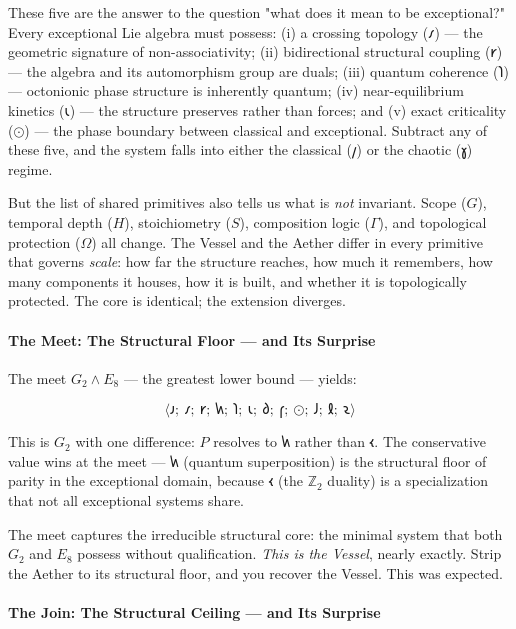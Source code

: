 \documentclass[12pt,a4paper]{article}
\begin{document}
These five are the answer to the question "what does it mean to be exceptional?" Every exceptional Lie algebra must possess: (i) a crossing topology ($𐑥$) --- the geometric signature of non-associativity; (ii) bidirectional structural coupling ($𐑾$) --- the algebra and its automorphism group are duals; (iii) quantum coherence ($𐑐$) --- octonionic phase structure is inherently quantum; (iv) near-equilibrium kinetics ($𐑧$) --- the structure preserves rather than forces; and (v) exact criticality ($⊙$) --- the phase boundary between classical and exceptional. Subtract any of these five, and the system falls into either the classical ($𐑢$) or the chaotic ($𐑣$) regime.

But the list of shared primitives also tells us what is \emph{not} invariant. Scope ($G$), temporal depth ($H$), stoichiometry ($S$), composition logic ($\Gamma$), and topological protection ($\Omega$) all change. The Vessel and the Aether differ in every primitive that governs \emph{scale}: how far the structure reaches, how much it remembers, how many components it houses, how it is built, and whether it is topologically protected. The core is identical; the extension diverges.

\paragraph{The Meet: The Structural Floor --- and Its Surprise}

The meet $G_2 \wedge E_8$ --- the greatest lower bound --- yields:

\[\langle 𐑨;\ 𐑥;\ 𐑾;\ 𐑿;\ 𐑐;\ 𐑧;\ 𐑔;\ 𐑝;\ ⊙;\ 𐑓;\ 𐑙;\ 𐑷 \rangle\]

This is $G_2$ with one difference: $P$ resolves to $𐑿$ rather than $𐑬$. The conservative value wins at the meet --- $𐑿$ (quantum superposition) is the structural floor of parity in the exceptional domain, because $𐑬$ (the $\mathbb{Z}_2$ duality) is a specialization that not all exceptional systems share.

The meet captures the irreducible structural core: the minimal system that both $G_2$ and $E_8$ possess without qualification. \emph{This is the Vessel}, nearly exactly. Strip the Aether to its structural floor, and you recover the Vessel. This was expected.

\paragraph{The Join: The Structural Ceiling --- and Its Surprise}
\end{document}
